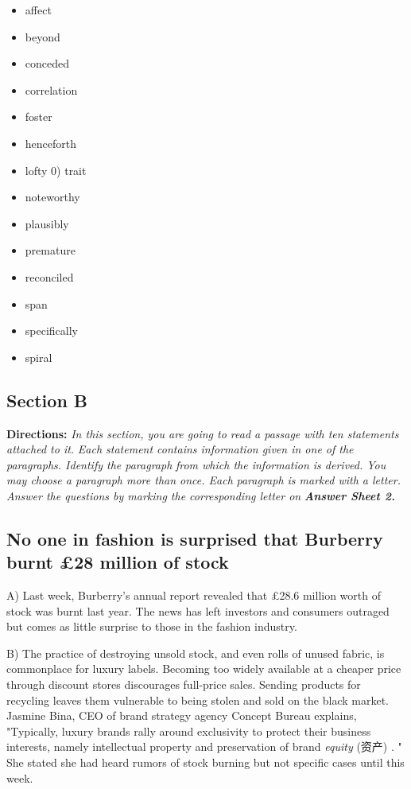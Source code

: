 \documentclass[UTF8,11pt]{ctexart}
\begin{document}
\begin{itemize}[leftmargin=2em,itemsep=.2em,topsep=.4em]\item[A.] affect
\item[B.] beyond
\item[C.] conceded
\item[D.] correlation
\item[E.] foster
\item[F.] henceforth
\item[G.] lofty 0) trait
\item[H.] noteworthy
\item[I.] plausibly
\item[J.] premature
\item[K.] reconciled
\item[L.] span
\item[M.] specifically
\item[N.] spiral
\end{itemize}

\subsection*{\textbf{Section B}}


\textbf{Directions: }\textit{In this section, you are going to read a passage with ten statements attached to it.} \textit{Each statement contains information given in one of the paragraphs. Identify the paragraph} \textit{from which the information is derived. You may choose a paragraph more than once. Each} \textit{paragraph is marked with a letter. Answer the questions by marking the corresponding letter on} \textbf{\textit{Answer Sheet 2.}}


\subsection*{\textbf{No one in fashion is surprised that Burberry burnt £28 million of stock}}


A) Last week, Burberry's annual report revealed that £28.6 million worth of stock was burnt last year. The news has left investors and consumers outraged but comes as little surprise to those in the fashion industry.


B) The practice of destroying unsold stock, and even rolls of unused fabric, is commonplace for luxury labels. Becoming too widely available at a cheaper price through discount stores discourages full-price sales. Sending products for recycling leaves them vulnerable to being stolen and sold on the black market. Jasmine Bina, CEO of brand strategy agency Concept Bureau explains, "Typically, luxury brands rally around exclusivity to protect their business interests, namely intellectual property and preservation of brand \textit{equity }(资产) . " She stated she had heard rumors of stock burning but not specific cases until this week.
\end{document}
